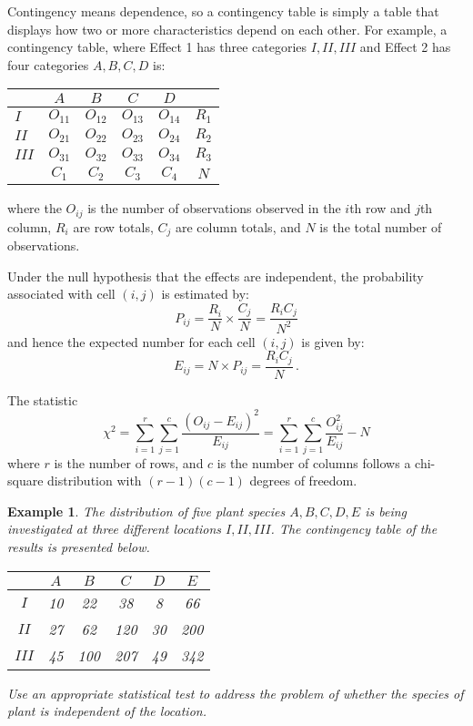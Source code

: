 \documentclass[12pt]{article}
\theoremstyle{break}
\newtheorem{example}[theorem]{Example}
\begin{document}
Contingency means dependence, so a contingency table is simply a table that displays how two or more characteristics depend on each other.  For example, a contingency table, where Effect 1 has three categories $I, II, III$ and Effect 2 has four categories $A, B, C, D$ is:
\begin{center}
\begin{tabular}{|l|c|c|c|c|c|}
  \hline
   & $A$ & $B$ & $C$ & $D$ &  \\ \hline
  $I$ & $O_{11}$ & $O_{12}$ & $O_{13}$ & $O_{14}$ & $R_{1}$ \\
  $II$ & $O_{21}$ & $O_{22}$ & $O_{23}$ & $O_{24}$ & $R_{2}$ \\
  $III$ & $O_{31}$ & $O_{32}$ & $O_{33}$ & $O_{34}$& $R_{3}$ \\ \hline
   & $C_{1}$ & $C_{2}$ & $C_{3}$ & $C_{4}$ & $N$ \\
  \hline
\end{tabular}
\end{center}
where the $O_{ij}$ is the number of observations observed in the $i$th row and $j$th column, $R_{i}$ are row totals, $C_{j}$ are column totals, and $N$ is the total number of observations.

Under the null hypothesis that the effects are independent, the probability associated with cell $(i,j)$ is estimated by:
$$
P_{ij}=\frac{R_{i}}{N}\times\frac{C_{j}}{N}=\frac{R_{i}C_{j}}{N^{2}}
$$
and hence the expected number for each cell $(i,j)$ is given by:
$$
E_{ij}=N \times P_{ij}=\frac{R_{i}C_{j}}{N} \,.
$$

The statistic
$$
\chi^{2}=\sum_{i=1}^{r}\sum_{j=1}^{c}\frac{(O_{ij}-E_{ij})^{2}}{E_{ij}}=\sum_{i=1}^{r}\sum_{j=1}^{c}\frac{O_{ij}^{2}}{E_{ij}}-N
$$
where $r$ is the number of rows, and $c$ is the number of columns follows a chi-square distribution with $(r-1)(c-1)$ degrees of freedom.

\begin{example}
The distribution of five plant species $A, B, C, D, E$ is being investigated at three different locations $I, II, III$. The contingency table of the results is presented below.
\begin{center}
\begin{tabular}{|c|c|c|c|c|c|}
               \hline
                & $A$ & $B$ & $C$ & $D$ & $E$ \\ \hline
               $I$ & 10 & 22 & 38 & 8 & 66 \\
               $II$ & 27 & 62 & 120 & 30 & 200 \\
               $III$ & 45 & 100 & 207 & 49 & 342 \\
               \hline
\end{tabular}
\end{center}
Use an appropriate statistical test to address the problem of whether the species of plant is independent of the location.
\end{example}
\end{document}
